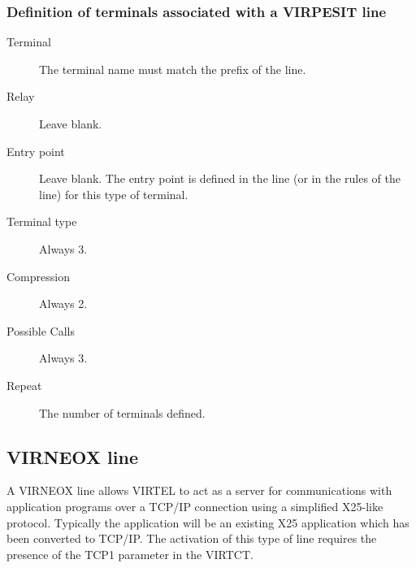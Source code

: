 \documentclass[letterpaper,10pt,english]{sphinxmanual}
\begin{document}
\subsubsection{Definition of terminals associated with a VIRPESIT line}
\label{\detokenize{connectivity_guide:definition-of-terminals-associated-with-a-virpesit-line}}\begin{description}
\item[{Terminal}] \leavevmode
The terminal name must match the prefix of the line.

\item[{Relay}] \leavevmode
Leave blank.

\item[{Entry point}] \leavevmode
Leave blank. The entry point is defined in the line (or in the rules
of the line) for this type of terminal.

\item[{Terminal type}] \leavevmode
Always 3.

\item[{Compression}] \leavevmode
Always 2.

\item[{Possible Calls}] \leavevmode
Always 3.

\item[{Repeat}] \leavevmode
The number of terminals defined.

\end{description}


\subsection{VIRNEOX line}
\label{\detokenize{connectivity_guide:virneox-line}}
A VIRNEOX line allows VIRTEL to act as a server for communications with application programs over a TCP/IP connection using a simplified X25-like protocol. Typically the application will be an  existing X25 application which has been converted to TCP/IP. The activation of this type of line requires the presence of the TCP1 parameter in the VIRTCT.

\end{document}
